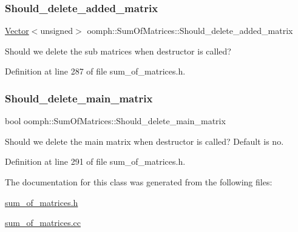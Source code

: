 \subsubsection{\texorpdfstring{Should\+\_\+delete\+\_\+added\+\_\+matrix}{Should\_delete\_added\_matrix}}
{\footnotesize\ttfamily \hyperlink{classoomph_1_1Vector}{Vector}$<$unsigned$>$ oomph\+::\+Sum\+Of\+Matrices\+::\+Should\+\_\+delete\+\_\+added\+\_\+matrix\hspace{0.3cm}{\ttfamily [private]}}



Should we delete the sub matrices when destructor is called? 



Definition at line 287 of file sum\+\_\+of\+\_\+matrices.\+h.

\mbox{\label{classoomph_1_1SumOfMatrices_af1a5407d43ff8bbf0715d28f6d9e1642}} 
\subsubsection{\texorpdfstring{Should\+\_\+delete\+\_\+main\+\_\+matrix}{Should\_delete\_main\_matrix}}
{\footnotesize\ttfamily bool oomph\+::\+Sum\+Of\+Matrices\+::\+Should\+\_\+delete\+\_\+main\+\_\+matrix\hspace{0.3cm}{\ttfamily [private]}}



Should we delete the main matrix when destructor is called? Default is no. 



Definition at line 291 of file sum\+\_\+of\+\_\+matrices.\+h.



The documentation for this class was generated from the following files\+:\begin{DoxyCompactItemize}
\item 
\hyperlink{sum__of__matrices_8h}{sum\+\_\+of\+\_\+matrices.\+h}\item 
\hyperlink{sum__of__matrices_8cc}{sum\+\_\+of\+\_\+matrices.\+cc}\end{DoxyCompactItemize}

